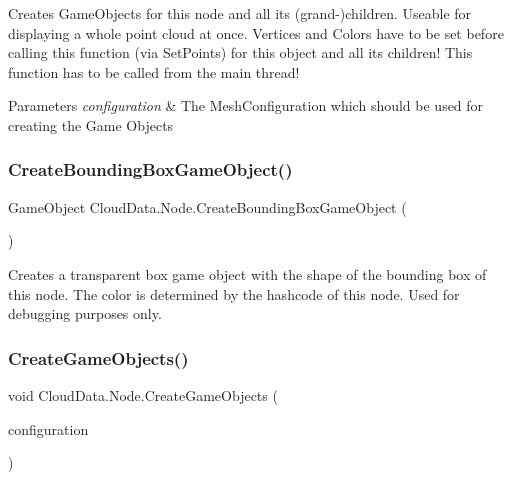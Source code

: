Creates Game\+Objects for this node and all its (grand-\/)children. Useable for displaying a whole point cloud at once. Vertices and Colors have to be set before calling this function (via Set\+Points) for this object and all its children! This function has to be called from the main thread! 


\begin{DoxyParams}{Parameters}
{\em configuration} & The Mesh\+Configuration which should be used for creating the Game Objects\\
\hline
\end{DoxyParams}
\mbox{\label{class_cloud_data_1_1_node_a79ada8b9a0cf64c7d23f70b862681f4c}} 
\subsubsection{\texorpdfstring{Create\+Bounding\+Box\+Game\+Object()}{CreateBoundingBoxGameObject()}}
{\footnotesize\ttfamily Game\+Object Cloud\+Data.\+Node.\+Create\+Bounding\+Box\+Game\+Object (\begin{DoxyParamCaption}{ }\end{DoxyParamCaption})\hspace{0.3cm}{\ttfamily [inline]}}



Creates a transparent box game object with the shape of the bounding box of this node. The color is determined by the hashcode of this node. Used for debugging purposes only. 

\mbox{\label{class_cloud_data_1_1_node_a5d81b4c9928dbdc1d204c13feb645da0}} 
\subsubsection{\texorpdfstring{Create\+Game\+Objects()}{CreateGameObjects()}}
{\footnotesize\ttfamily void Cloud\+Data.\+Node.\+Create\+Game\+Objects (\begin{DoxyParamCaption}\item[{\hyperlink{class_object_creation_1_1_mesh_configuration}{Mesh\+Configuration}}]{configuration }\end{DoxyParamCaption})\hspace{0.3cm}{\ttfamily [inline]}}



